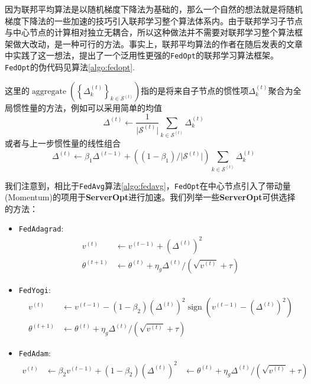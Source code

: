 因为联邦平均算法是以随机梯度下降法为基础的，那么一个自然的想法就是将随机梯度下降法的一些加速的技巧\cite{adagrad, adam, Zaheer_2018_yogi, adamw_amsgrad}引入联邦学习整个算法体系内。由于联邦学习子节点与中心节点的计算相对独立无耦合，所以这种做法并不需要对联邦学习整个算法框架做大改动，是一种可行的方法。事实上，联邦平均算法的作者在随后发表的文章\parencite{reddi2020fed_opt}中实践了这一想法，提出了一个泛用性更强的\texttt{FedOpt}的联邦学习算法框架。\texttt{FedOpt}的伪代码见算法\ref{algo:fedopt}. 



这里的$\operatorname{aggregate} \left( \left\{ \Delta_{k}^{(t)} \right\}_{k \in \mathcal{S}^{(t)}} \right)$指的是将来自子节点的惯性项$\Delta_{k}^{(t)}$聚合为全局惯性量的方法，例如可以采用简单的均值
\begin{equation*}
\Delta^{(t)} \gets \frac{1}{\lvert \mathcal{S}^{(t)} \rvert} \sum\limits_{k \in \mathcal{S}^{(t)}} \Delta_{k}^{(t)}
\end{equation*}
或者与上一步惯性量的线性组合
\begin{equation*}
\Delta^{(t)} \gets \beta_1 \Delta^{(t-1)} + \left( (1 - \beta_1) / \lvert \mathcal{S}^{(t)} \rvert \right) \sum_{k \in \mathcal{S}^{(t)}} \Delta_{k}^{(t)}
\end{equation*}

我们注意到，相比于\texttt{FedAvg}算法\ref{algo:fedavg}，\texttt{FedOpt}在中心节点引入了带动量(Momentum)的项用于\textbf{ServerOpt}进行加速。我们列举一些\textbf{ServerOpt}可供选择的方法\cite{reddi2020fed_opt}：
\begin{itemize}
    \item \texttt{FedAdagrad}:
    \begin{equation*}
    \begin{aligned}
    v^{(t)} & \gets v^{(t-1)} + ( \Delta^{(t)} )^2 \\
    \theta^{(t+1)} & \gets \theta^{(t)} + \eta_g \Delta^{(t)} / (\sqrt{v^{(t)}}+\tau)
    \end{aligned}
    \end{equation*}
    \item \texttt{FedYogi}:
    \begin{equation*}
    \begin{aligned}
    v^{(t)} & \gets v^{(t-1)} - (1 - \beta_2) ( \Delta^{(t)} )^2 \operatorname{sign}(v^{(t-1)} - ( \Delta^{(t)} )^2) \\
    \theta^{(t+1)} & \gets \theta^{(t)} + \eta_g \Delta^{(t)} / (\sqrt{v^{(t)}}+\tau)
    \end{aligned}
    \end{equation*}
    \item \texttt{FedAdam}:
    \begin{equation*}
    \begin{aligned}
    v^{(t)} & \gets \beta_2 v^{(t-1)} + (1 - \beta_2) ( \Delta^{(t)} )^2 & \gets \theta^{(t)} + \eta_g \Delta^{(t)} / (\sqrt{v^{(t)}}+\tau)
    \end{aligned}
    \end{equation*}
\end{itemize}

